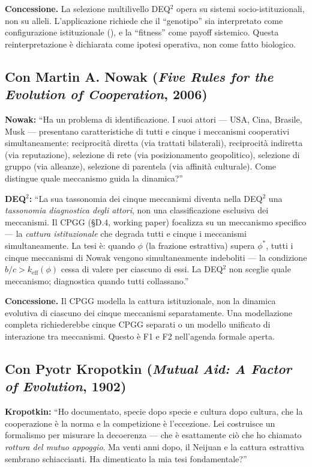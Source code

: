 \textbf{Concessione.} La selezione multilivello DEQ$^2$ opera su sistemi
socio-istituzionali, non su alleli. L'applicazione richiede che il
``genotipo'' sia interpretato come configurazione istituzionale
(\Hypoth{}), e la ``fitness'' come payoff sistemico. Questa
reinterpretazione è dichiarata come ipotesi operativa, non come fatto
biologico.

\subsection{Con Martin A. Nowak (\emph{Five Rules for the Evolution of
Cooperation}, 2006)}\label{con-nowak-2006}

\textbf{Nowak:} ``Ha un problema di identificazione. I suoi attori ---
USA, Cina, Brasile, Musk --- presentano caratteristiche di tutti e cinque
i meccanismi cooperativi simultaneamente: reciprocità diretta (via trattati
bilaterali), reciprocità indiretta (via reputazione), selezione di rete
(via posizionamento geopolitico), selezione di gruppo (via alleanze),
selezione di parentela (via affinità culturale). Come distingue quale
meccanismo guida la dinamica?''

\textbf{DEQ$^2$:} ``La sua tassonomia dei cinque meccanismi diventa
nella DEQ$^2$ una \emph{tassonomia diagnostica degli attori}, non una
classificazione esclusiva dei meccanismi. Il CPGG (§D.4, working paper)
focalizza su un meccanismo specifico --- la \emph{cattura istituzionale}
che degrada tutti e cinque i meccanismi simultaneamente. La tesi è:
quando $\phi$ (la frazione estrattiva) supera $\phi^*$, tutti i cinque
meccanismi di Nowak vengono simultaneamente indeboliti --- la condizione
$b/c > k_{\text{eff}}(\phi)$ cessa di valere per ciascuno di essi. La
DEQ$^2$ non sceglie quale meccanismo; diagnostica quando tutti
collassano.''

\textbf{Concessione.} Il CPGG modella la cattura istituzionale, non la
dinamica evolutiva di ciascuno dei cinque meccanismi separatamente. Una
modellazione completa richiederebbe cinque CPGG separati o un modello
unificato di interazione tra meccanismi. Questo è F1 e F2 nell'agenda
formale aperta.

\subsection{Con Pyotr Kropotkin (\emph{Mutual Aid: A Factor of
Evolution}, 1902)}\label{con-kropotkin-1902}

\textbf{Kropotkin:} ``Ho documentato, specie dopo specie e cultura dopo
cultura, che la cooperazione è la norma e la competizione è l'eccezione.
Lei costruisce un formalismo per misurare la decoerenza --- che è
esattamente ciò che ho chiamato \emph{rottura del mutuo appoggio}. Ma
venti anni dopo, il Neijuan e la cattura estrattiva sembrano
schiaccianti. Ha dimenticato la mia tesi fondamentale?''

